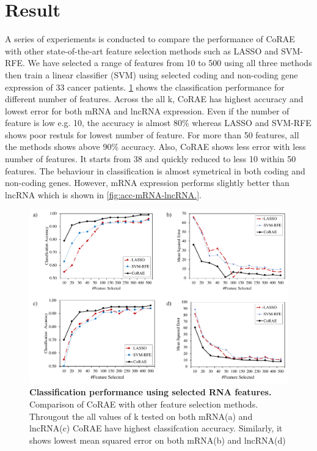 \documentclass{bioinfo}
\begin{document}
\section{Result}
A series of experiements is conducted to compare the performance of CoRAE with other state-of-the-art feature selection methods such as LASSO and SVM-RFE. We have selected a range of features from 10 to 500 using all three methods then train a linear classifier (SVM) using selected coding and non-coding gene expression of 33 cancer patients. \ref{fig:acc-mse} shows the classification performance for different number of features. Across the all k, CoRAE has highest accuracy and lowest error for both mRNA and lncRNA expression. Even if the number of feature is low e.g. 10, the accuracy is almost 80\% whereas LASSO and SVM-RFE shows poor restuls for lowest number of feature. For more than 50 features, all the methods shows above 90\% accuracy. Also, CoRAE shows less error with less number of features. It starts from 38 and quickly reduced to less 10 within 50 features. The behaviour in classification is almost symetrical in both coding and non-coding genes. However, mRNA expression performs slightly better than lncRNA which is shown in \ref{fig:acc-mRNA-lncRNA.}.
\begin{figure}[hbt]
    \centering
    \includegraphics[scale=0.5]{fig/acc-mse.pdf}
    \caption{\textbf{Classification performance using selected RNA features.}  Comparison of CoRAE with other feature selection methods. Througout the all values of k tested on both mRNA(a) and lncRNA(c) CoRAE have highest classifcation accuracy. Similarly, it shows lowest mean squared error on both mRNA(b) and lncRNA(d)}
    \label{fig:acc-mse}
\end{figure}
\end{document}
